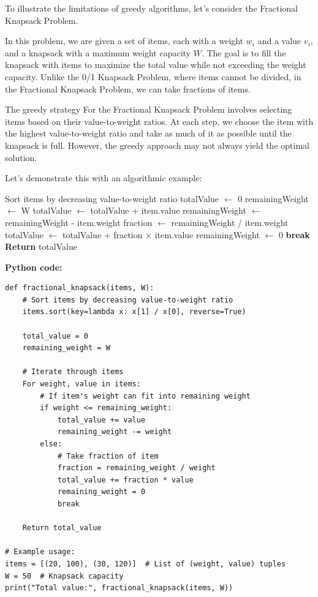 \documentclass[12pt]{book} %
\begin{document}
To illustrate the limitations of greedy algorithms, let's consider the Fractional Knapsack Problem. 

In this problem, we are given a set of items, each with a weight \( w_i \) and a value \( v_i \), and a knapsack with a maximum weight capacity \( W \). The goal is to fill the knapsack with items to maximize the total value while not exceeding the weight capacity. Unlike the 0/1 Knapsack Problem, where items cannot be divided, in the Fractional Knapsack Problem, we can take fractions of items.

The greedy strategy For the Fractional Knapsack Problem involves selecting items based on their value-to-weight ratios. At each step, we choose the item with the highest value-to-weight ratio and take as much of it as possible until the knapsack is full. However, the greedy approach may not always yield the optimal solution.

Let's demonstrate this with an algorithmic example:

\begin{algorithm}
\caption{Greedy Fractional Knapsack Algorithm}
\begin{algorithmic}[1]
    \State Sort items by decreasing value-to-weight ratio
    \State totalValue $\gets$ 0
    \State remainingWeight $\gets$ W
            \State totalValue $\gets$ totalValue + item.value
            \State remainingWeight $\gets$ remainingWeight - item.weight
        \Else
            \State fraction $\gets$ remainingWeight / item.weight
            \State totalValue $\gets$ totalValue + fraction $\times$ item.value
            \State remainingWeight $\gets$ 0
            \State \textbf{break}
        \EndIf
    \EndFor
    \State \textbf{Return} totalValue
\EndProcedure
\end{algorithmic}
\end{algorithm}

\textbf{Python code:}
\FloatBarrier
\begin{lstlisting}
def fractional_knapsack(items, W):
    # Sort items by decreasing value-to-weight ratio
    items.sort(key=lambda x: x[1] / x[0], reverse=True)
    
    total_value = 0
    remaining_weight = W
    
    # Iterate through items
    For weight, value in items:
        # If item's weight can fit into remaining weight
        if weight <= remaining_weight:
            total_value += value
            remaining_weight -= weight
        else:
            # Take fraction of item
            fraction = remaining_weight / weight
            total_value += fraction * value
            remaining_weight = 0
            break
            
    Return total_value

# Example usage:
items = [(20, 100), (30, 120)]  # List of (weight, value) tuples
W = 50  # Knapsack capacity
print("Total value:", fractional_knapsack(items, W))
\end{lstlisting}
\FloatBarrier
\end{document}
